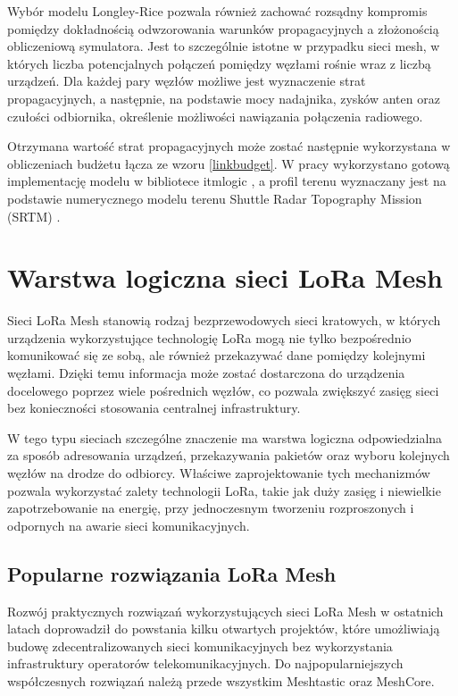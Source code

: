\documentclass[12pt,a4paper,twoside]{report}
\theoremstyle{definition} %
\begin{document}
Wybór modelu Longley-Rice pozwala również zachować rozsądny kompromis pomiędzy dokładnością odwzorowania warunków propagacyjnych a złożonością obliczeniową symulatora. Jest to szczególnie istotne w przypadku sieci mesh, w których liczba potencjalnych połączeń pomiędzy węzłami rośnie wraz z liczbą urządzeń. Dla każdej pary węzłów możliwe jest wyznaczenie strat propagacyjnych, a następnie, na podstawie mocy nadajnika, zysków anten oraz czułości odbiornika, określenie możliwości nawiązania połączenia radiowego.

Otrzymana wartość strat propagacyjnych może zostać następnie wykorzystana w obliczeniach budżetu łącza ze wzoru \eqref{linkbudget}. W pracy wykorzystano gotową implementację modelu w bibliotece itmlogic \cite{oughton2020}, a profil terenu wyznaczany jest na podstawie numerycznego modelu terenu Shuttle Radar Topography Mission (SRTM) \cite{farr2007}.

\cleardoublepage
\chapter{Warstwa logiczna sieci LoRa Mesh}
    Sieci LoRa Mesh stanowią rodzaj bezprzewodowych sieci kratowych, w których urządzenia wykorzystujące technologię LoRa mogą nie tylko bezpośrednio komunikować się ze sobą, ale również przekazywać dane pomiędzy kolejnymi węzłami. Dzięki temu informacja może zostać dostarczona do urządzenia docelowego poprzez wiele pośrednich węzłów, co pozwala zwiększyć zasięg sieci bez konieczności stosowania centralnej infrastruktury.

    W tego typu sieciach szczególne znaczenie ma warstwa logiczna odpowiedzialna za sposób adresowania urządzeń, przekazywania pakietów oraz wyboru kolejnych węzłów na drodze do odbiorcy. Właściwe zaprojektowanie tych mechanizmów pozwala wykorzystać zalety technologii LoRa, takie jak duży zasięg i niewielkie zapotrzebowanie na energię, przy jednoczesnym tworzeniu rozproszonych i odpornych na awarie sieci komunikacyjnych.
    
    \section{Popularne rozwiązania LoRa Mesh}
    Rozwój praktycznych rozwiązań wykorzystujących sieci LoRa Mesh w ostatnich latach doprowadził do powstania kilku otwartych projektów, które umożliwiają budowę zdecentralizowanych sieci komunikacyjnych bez wykorzystania infrastruktury operatorów telekomunikacyjnych. Do najpopularniejszych współczesnych rozwiązań należą przede wszystkim Meshtastic oraz MeshCore.
    
\end{document}
